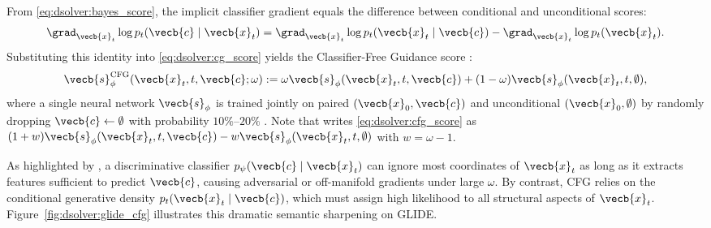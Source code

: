 \documentclass[../../../../master.tex]{subfiles}
\begin{document}
\begin{coremath}
From \eqref{eq:dsolver:bayes_score}, the implicit classifier gradient equals the difference between conditional and unconditional scores:
\begin{equation}
  \grad_{\vecb{x}_t} \log p_t(\vecb{c} \mid \vecb{x}_t)
  = \grad_{\vecb{x}_t} \log p_t(\vecb{x}_t \mid \vecb{c}) - \grad_{\vecb{x}_t} \log p_t(\vecb{x}_t).
\end{equation}
Substituting this identity into \eqref{eq:dsolver:cg_score} yields the Classifier-Free Guidance score :
\begin{equation}
  \label{eq:dsolver:cfg_score}
  \vecb{s}_{\phi}^{\mathrm{CFG}}(\vecb{x}_t, t, \vecb{c}; \omega)
  := \omega \vecb{s}_\phi(\vecb{x}_t, t, \vecb{c}) + (1 - \omega) \vecb{s}_\phi(\vecb{x}_t, t, \emptyset),
\end{equation}
where a single neural network $\vecb{s}_\phi$ is trained jointly on paired $(\vecb{x}_0, \vecb{c})$ and unconditional $(\vecb{x}_0, \emptyset)$ by randomly dropping $\vecb{c} \gets \emptyset$ with probability $10\%$--$20\%$ . Note that  writes \eqref{eq:dsolver:cfg_score} as $(1+w)\vecb{s}_\phi(\vecb{x}_t, t, \vecb{c}) - w\vecb{s}_\phi(\vecb{x}_t, t, \emptyset)$ with $w = \omega - 1$.
\end{coremath}

\begin{intuition}
As highlighted by , a discriminative classifier $p_\psi(\vecb{c}\mid\vecb{x}_t)$ can ignore most coordinates of $\vecb{x}_t$ as long as it extracts features sufficient to predict $\vecb{c}$, causing adversarial or off-manifold gradients under large $\omega$. By contrast, CFG relies on the conditional generative density $p_t(\vecb{x}_t\mid\vecb{c})$, which must assign high likelihood to all structural aspects of $\vecb{x}_t$. Figure~\ref{fig:dsolver:glide_cfg} illustrates this dramatic semantic sharpening on GLIDE.
\end{intuition}

\end{document}
